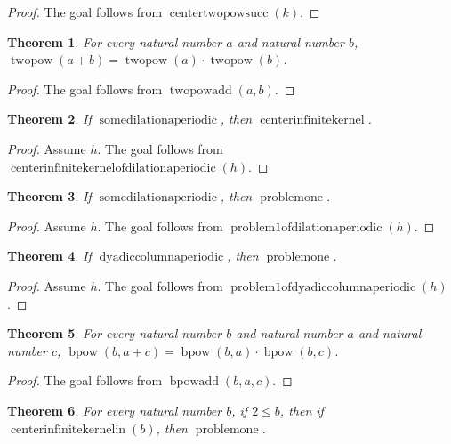 \documentclass[11pt]{article}
\newtheorem{theorem}{Theorem}[section]
\theoremstyle{definition}
\begin{document}
\begin{proof}
The goal follows from \(\operatorname{centertwopowsucc}(k)\).
\end{proof}
\begin{theorem}
\label{ll:observations:twopow-add}
For every natural number \(a\) and natural number \(b\), \(\operatorname{twopow}(a + b) = \operatorname{twopow}(a) \cdot \operatorname{twopow}(b)\).
\end{theorem}
\begin{proof}
The goal follows from \(\operatorname{twopowadd}(a, b)\).
\end{proof}
\begin{theorem}
\label{ll:observations:center-infinite-kernel-of-dilation-aperiodic}
If \(\operatorname{somedilationaperiodic}\), then \(\operatorname{centerinfinitekernel}\).
\end{theorem}
\begin{proof}
Assume \(h\).
The goal follows from \(\operatorname{centerinfinitekernelofdilationaperiodic}(h)\).
\end{proof}
\begin{theorem}
\label{ll:observations:problem1-of-dilation-aperiodic}
If \(\operatorname{somedilationaperiodic}\), then \(\operatorname{problemone}\).
\end{theorem}
\begin{proof}
Assume \(h\).
The goal follows from \(\operatorname{problem1ofdilationaperiodic}(h)\).
\end{proof}
\begin{theorem}
\label{ll:observations:problem1-of-dyadic-column-aperiodic}
If \(\operatorname{dyadiccolumnaperiodic}\), then \(\operatorname{problemone}\).
\end{theorem}
\begin{proof}
Assume \(h\).
The goal follows from \(\operatorname{problem1ofdyadiccolumnaperiodic}(h)\).
\end{proof}
\begin{theorem}
\label{ll:observations:bpow-add}
For every natural number \(b\) and natural number \(a\) and natural number \(c\), \(\operatorname{bpow}(b, a + c) = \operatorname{bpow}(b, a) \cdot \operatorname{bpow}(b, c)\).
\end{theorem}
\begin{proof}
The goal follows from \(\operatorname{bpowadd}(b, a, c)\).
\end{proof}
\begin{theorem}
\label{ll:observations:problem1-of-infinite-kernel-in}
For every natural number \(b\), if \(2 \le b\), then if \(\operatorname{centerinfinitekernelin}(b)\), then \(\operatorname{problemone}\).
\end{theorem}
\end{document}
